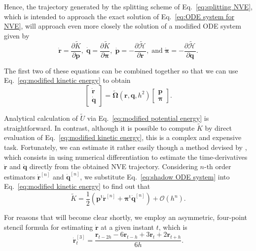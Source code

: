 \documentclass[
journal=jctcce,
layout=twocolumn
]{achemso}
\newcommand{\vt}[1]{\boldsymbol{\mathbf{#1}}}   %
\newcommand{\tr}[1]{#1^\text{t}}                %
\newcommand{\diff}[2]{\frac{\partial #1}{\partial #2}} %
\newcommand{\Ham}[1]{{\mathcal H}_\text{#1}}    %
\newcommand{\timestep}{h}
\newcommand{\modified}[1]{\widetilde{#1}}
\begin{document}
Hence, the trajectory generated by the splitting scheme of Eq.~\ref{eq:splitting NVE}, which is intended to approach the exact solution of Eq.~\eqref{eq:ODE system for NVE}, will approach even more closely the solution of a modified ODE system given by
\begin{equation*}
\dot{\vt r} = \diff{\modified K}{\vt p}, \;
\dot{\vt q} = \diff{\modified K}{\vt \pi}, \;
\dot{\vt p} = -\diff{\modified{\Ham{}}}{\vt r}, \; \text{and} \;
\dot{\vt \pi} = -\diff{\modified{\Ham{}}}{\vt q}.
\end{equation*}

The first two of these equations can be combined together so that we can use Eq.~\eqref{eq:modified kinetic energy} to obtain
\begin{equation}
\label{eq:shadow ODE system}
\left[\begin{array}{c} \dot{\vt r} \\ \dot{\vt q} \end{array}\right] = \modified{\mathbf \Omega}(\vt r, \vt q, \timestep^2) \left[\begin{array}{c} \vt p \\ \vt \pi \end{array}\right].
\end{equation}

Analytical calculation of $\modified U$ via Eq.~\eqref{eq:modified potential energy} is straightforward.
In contrast, although it is possible to compute $\modified K$ by direct evaluation of Eq.~\eqref{eq:modified kinetic energy}, this is a complex and expensive task.
Fortunately, we can estimate it rather easily though a method devised by \citeauthor{Eastwood_2010} \cite{Eastwood_2010}, which consists in using numerical differentiation to estimate the time-derivatives $\dot{\vt r}$ and $\dot{\vt q}$ directly from the obtained NVE trajectory.
Considering $n$-th order estimators $\dot{\vt r}^{[n]}$ and $\dot{\vt q}^{[n]}$, we substitute Eq.~\eqref{eq:shadow ODE system} into Eq.~\eqref{eq:modified kinetic energy} to find out that
\begin{equation}
\label{eq:modified kinetic energy estimator}
\modified K = \frac{1}{2} \left( \tr{\vt p} \dot{\vt r}^{[n]} + \tr{\vt \pi} \dot{\vt q}^{[n]} \right) + \mathcal{O}(h^n).
\end{equation}

For reasons that will become clear shortly, we employ an asymmetric, four-point stencil formula for estimating $\dot{\vt r}$ at a given instant $t$, which is
\begin{equation*}
\dot{\vt r}^{[3]}_t = \frac{{\vt r}_{t-2\timestep} - 6 {\vt r}_{t-\timestep} + 3 {\vt r}_t + 2 {\vt r}_{t+\timestep}}{6\timestep}.
\end{equation*}
\end{document}
